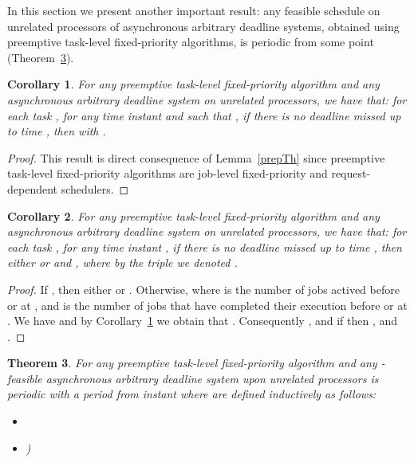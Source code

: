 \documentclass[a4paper,11pt]{article}
\newtheorem{Theorem}{Theorem}
\newtheorem{Corollary}[Theorem]{Corollary}
\begin{document}
In this section we present another important result: any feasible schedule on
 unrelated processors of asynchronous arbitrary deadline systems,
obtained using preemptive task-level fixed-priority algorithms, is periodic from
some point (Theorem~\ref{asynPerbis}).

\begin{Corollary}\label{prepThbis} 
  For any preemptive task-level fixed-priority algorithm  and any asynchronous
  arbitrary deadline system  on  unrelated processors, we
  have that: for each task , for any time instant 
  and  such that , if there is no
  deadline missed up to time , then  with .
\end{Corollary}

\begin{proof}
  This result is direct consequence of Lemma~\ref{prepTh} since preemptive
  task-level fixed-priority algorithms are job-level fixed-priority and request-dependent schedulers.
\end{proof}





\begin{Corollary} \label{Coreither}
  For any preemptive task-level fixed-priority algorithm  and any asynchronous
  arbitrary deadline system  on  unrelated processors, we
  have that: for each task , for any time instant , if there is no deadline missed up to time , then either
   or  and
  , where by the triple 
   we denoted .
\end{Corollary}

\begin{proof} If , then either  or
  . Otherwise,
   where  is the number of jobs
  actived before or at , and  is the number of jobs that
  have completed their execution before or at . We have
   and by Corollary~\ref{prepThbis} we
  obtain that . Consequently
  , and if 
  then , and .
\end{proof}



\begin{Theorem} \label{asynPerbis} For any preemptive task-level fixed-priority
  algorithm  and any -feasible asynchronous arbitrary deadline system 
  upon  unrelated processors is periodic with a period  from instant  where 
  are defined inductively as follows: 

  \begin{itemize}
  \item 
  \item )
   \end{itemize}
\end{Theorem}
\end{document}
